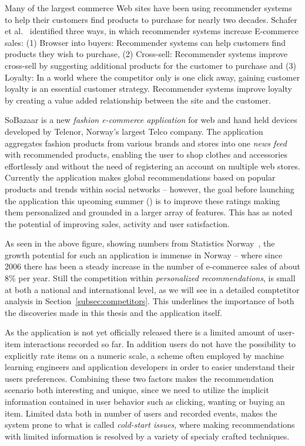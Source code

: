 Many of the largest commerce Web sites have been using recommender systems to
help their customers find products to purchase for nearly two decades.
Schafer et al.~\cite{Schafer1999} identified three ways, in which recommender
systems increase E-commerce sales: (1) Browser into buyers: Recommender systems
can help customers find products they wish to purchase, (2) Cross-sell:
Recommender systems improve cross-sell by suggesting additional products for
the customer to purchase and (3) Loyalty: In a world where the competitor only
is one click away, gaining customer loyalty is an essential customer strategy.
Recommender systems improve loyalty by creating a value added relationship
between the site and the customer.

SoBazaar is a new \textit{fashion e-commerce application} for web and hand held
devices developed by Telenor, Norway's largest Telco company. The application
aggregates fashion products from various brands and stores into one \emph{news
feed} with recommended products, enabling the user to shop clothes and
accessories effortlessly and without the need of registering an account on
multiple web stores. Currently the application makes global recommendations
based on popular products and trends within social networks -- however, the goal
before launching the application this upcoming summer (\the\year) is to improve
these ratings making them personalized and grounded in a larger array of
features. This has as noted the potential of improving sales, activity and user
satisfaction.

\ecommercenorway{}

As seen in the above figure, showing numbers from Statistics
Norway~\cite{statisticsNorway}, the growth potential for such an application is
immense in Norway -- where since 2006 there has been a steady increase in the
number of e-commerce sales of about 8\% per year. Still the competition within
\textit{personalized recommendations}, is small at both a national and
international level, as we will see in a detailed comptetitor analysis in
Section~\ref{subsec:competitors}. This underlines the importance of both the
discoveries made in this thesis and the application itself.

As the application is not yet officially released there is a limited amount of
user-item interactions recorded so far. In addition users do not have the
possibility to explicitly rate items on a numeric scale, a scheme often
employed by machine learning engineers and application developers in order to
easier understand their users preferences. Combining these two factors makes
the recommendation scenario both interesting and unique, since we need to
utilize the implicit information contained in user behavior such as clicking,
wanting or buying an item. Limited data both in number of users and recorded
events, makes the system prone to what is called \textit{cold-start issues},
where making recommendations with limited information is resolved by a variety
of specialy crafted techniques.

